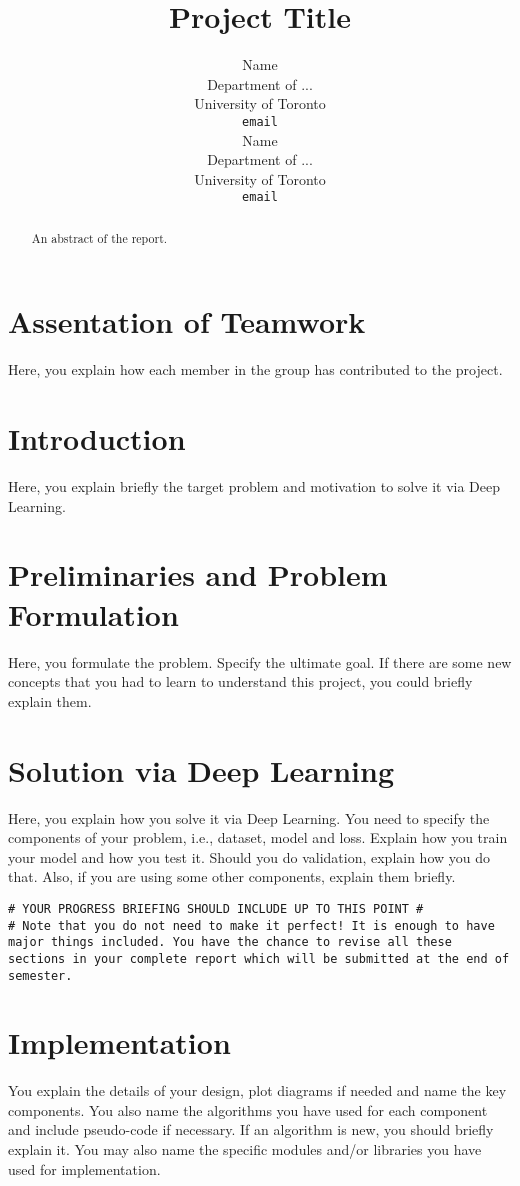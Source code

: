 \documentclass{article}
\title{Project Title}
\author{%
  Name\\
  Department of ...\\
  University of Toronto\\
  \texttt{email} \\
  \And
  Name\\
  Department of ...\\
  University of Toronto\\
  \texttt{email} \\
}
\begin{document}
\maketitle


\begin{abstract}
An abstract of the report.
\end{abstract}

\section*{Assentation of Teamwork}
Here, you explain how each member in the group has contributed to the project. 

\color{red}
\color{black}


\section{Introduction}
Here, you explain briefly the target problem and motivation to solve it via Deep Learning.

\section{Preliminaries and Problem Formulation}
Here, you formulate the problem. Specify the ultimate goal. If there are some new concepts that you had to learn to understand this project, you could briefly explain them. 
	
\section{Solution via Deep Learning}
Here, you explain how you solve it via Deep Learning. You need to specify the components of your problem, i.e., dataset, model and loss. Explain how you train your model and how you test it. Should you do validation, explain how you do that. Also, if you are using some other components, explain them briefly.

	
\color{red}
\texttt{\# YOUR PROGRESS BRIEFING SHOULD INCLUDE UP TO THIS POINT \#\\
\# Note that you do not need to make it perfect! It is enough to have major things included. You have the chance to revise all these sections in your complete report which will be submitted at the end of semester.}
\color{black}


\section{Implementation}
You explain the details of your design, plot diagrams if needed and name the key components. You also name the algorithms you have used for each component and include pseudo-code if necessary. If an algorithm is new, you should briefly explain it. You may also name the specific modules and/or libraries you have used for implementation.
	
\end{document}
